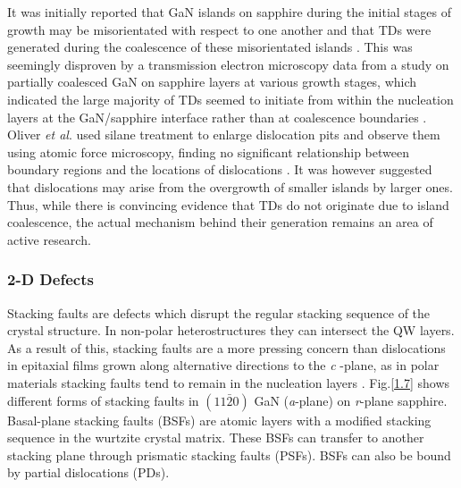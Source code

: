 It was initially reported that GaN islands on sapphire during the initial stages of growth may be misorientated with respect to one another and that TDs were generated during the coalescence of these misorientated islands \cite{Ning1996}. This was seemingly disproven by a transmission electron microscopy data from a study on partially coalesced GaN on sapphire layers at various growth stages, which indicated the large majority of TDs seemed to initiate from within the nucleation layers at the GaN/sapphire interface rather than at coalescence boundaries \cite{Moram2009}. Oliver {\it et al}. used silane treatment to enlarge dislocation pits and observe them using atomic force microscopy, finding no significant relationship between boundary regions and the locations of dislocations \cite{Oliver2008a}. It was however suggested that dislocations may arise from the overgrowth of smaller islands by larger ones. Thus, while there is convincing evidence that TDs do not originate due to island coalescence, the actual mechanism behind their generation remains an area of active research.

\subsubsection{2-D Defects}

Stacking faults are defects which disrupt the regular stacking sequence of the crystal structure. In non-polar heterostructures they can intersect the QW layers. As a result of this, stacking faults are a more pressing concern than dislocations in epitaxial films grown along alternative directions to the {\it c}
-plane, as in polar materials stacking faults tend to remain in the nucleation layers \cite{Scholz2012}. Fig.\ref{1.7} shows different forms of stacking faults in $(11\bar{2}0)$ GaN ({\it a}-plane) on {\it r}-plane sapphire.  Basal-plane stacking faults  (BSFs) are atomic layers with a modified stacking sequence in the wurtzite crystal matrix. These BSFs can transfer to another stacking plane through prismatic stacking faults  (PSFs). BSFs can also be bound by partial dislocations  (PDs).


